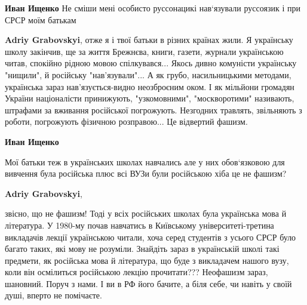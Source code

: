 \begin{itemize}
\begin{itemize}
 
\textbf{Иван Ищенко} Не сміши мені особисто руссонацикі нав‘язували руссоязик і при СРСР моїм батькам

 
\textbf{Adriy Grabovskyi}, отже я і твої батьки в різних країнах жили. Я
українську школу закінчив, ще за життя Брежнєва, книги, газети, журнали
українською читав, спокійно рідною мовою спілкувався... Якось дивно комуністи
українську "нищили", й російську "нав'язували"... А як грубо, насильницькими
методами, українська зараз нав'язується-видно неозброєним оком. І як мільйони
громадян України націоналісти принижують, "узкомовними", "москворотими"
називають, штрафами за вживання російської погрожують. Незгодних травлять,
звільняють з роботи, погрожують фізичною розправою... Це відвертий фашизм.


 
\textbf{Иван Ищенко} 

Мої батьки теж в українських школах навчались але у них обов‘язковою для
вивчення була російська плюс всі ВУЗи були російською хіба це не фашизм?

 
\textbf{Adriy Grabovskyi},

звісно, що не фашизм! Тоді у всіх російських школах була українська мова й
література. У 1980-му почав навчатись в Київському університеті-третина
викладачів лекції українською читали, хоча серед студентів з усього СРСР було
багато таких, які мову не розуміли. Знайдіть зараз в українській школі такі
предмети, як російська мова й література, що буде з викладачем нашого вузу, коли
він осмілиться російською лекцію прочитати??? Неофашизм зараз, шановний. Поруч з
нами. І ви в РФ його бачите, а біля себе, чи навіть у своїй душі, вперто не
помічаєте.



\end{itemize}
\end{itemize}
